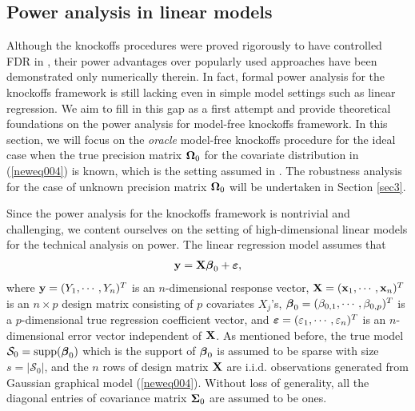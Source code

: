\documentclass[11pt]{article}
\newcommand{\bx}{\mbox{\bf x}}
\newcommand{\by}{\mbox{\bf y}}
\newcommand{\bX}{\mbox{\bf X}}
\newcommand{\bveps}{\mbox{\boldmath $\varepsilon$}}
\newcommand{\bbeta}{\mbox{\boldmath $\beta$}}
\newcommand{\bSig}{\mbox{\boldmath $\Sigma$}}
\newcommand{\bOmg}{\mbox{\boldmath $\Omega$}}
\newcommand{\veps}{\varepsilon}
\newcommand{\supp}{\mathrm{supp}}
\def\t{^T}
\begin{document}
\subsection{Power analysis in linear models} \label{sec: oracle-power}

Although the knockoffs procedures were proved rigorously to have controlled FDR in \cite{BarberCandes2015, BarberCandes2016, CandesFanJansonLv2016}, their power advantages over popularly used approaches have been demonstrated only numerically therein. In fact, formal power analysis for the knockoffs framework is still lacking even in simple model settings such as linear regression. We aim to fill in this gap as a first attempt and provide theoretical foundations on the power analysis for model-free knockoffs framework. In this section, we will focus on the \textit{oracle} model-free knockoffs procedure for the ideal case when the true precision matrix $\bOmg_0$ for the covariate distribution in (\ref{neweq004}) is known, which is the setting assumed in \cite{CandesFanJansonLv2016}. The robustness analysis for the case of unknown precision matrix $\bOmg_0$ will be undertaken in Section \ref{sec3}.

Since the power analysis for the knockoffs framework is nontrivial and challenging, we content ourselves on the setting of high-dimensional linear models for the technical analysis on power. The linear regression model assumes that
\begin{align}\label{eq001}
  \by = \bX\bbeta_0 + \bveps,
  \end{align}
where $\by=(Y_1,\cdots, Y_n)^T$ is an $n$-dimensional response vector, $\bX = (\bx_1, \cdots, \bx_n)^T$ is an $n \times p$ design matrix consisting of $p$ covariates $X_j$'s, $\bbeta_0 = (\beta_{0, 1}, \cdots, \beta_{0, p})\t$ is a $p$-dimensional true regression coefficient vector, and $\bveps = (\veps_1,\cdots, \veps_n)^T$ is an $n$-dimensional error vector independent of $\bX$. As mentioned before, the true model $\mathcal{S}_0 = \supp(\bbeta_0)$ which is the support of $\bbeta_0$ is assumed to be sparse with size $s=|\mathcal{S}_0|$, and the $n$ rows of design matrix $\bX$ are i.i.d. observations generated from Gaussian graphical model (\ref{neweq004}). Without loss of generality, all the diagonal entries of covariance matrix $\bSig_0$ are assumed to be ones.
\end{document}
